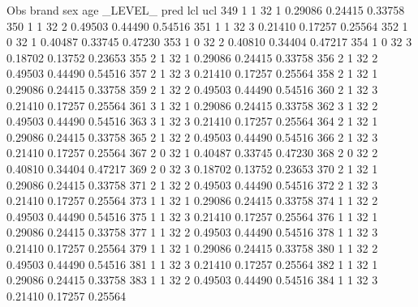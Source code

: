 \documentclass{article}
\begin{document}
\begin{Woutput}
 Obs    brand    sex    age    _LEVEL_      pred       lcl        ucl
 349      1       1      32       1       0.29086    0.24415    0.33758
 350      1       1      32       2       0.49503    0.44490    0.54516
 351      1       1      32       3       0.21410    0.17257    0.25564
 352      1       0      32       1       0.40487    0.33745    0.47230
 353      1       0      32       2       0.40810    0.34404    0.47217
 354      1       0      32       3       0.18702    0.13752    0.23653
 355      2       1      32       1       0.29086    0.24415    0.33758
 356      2       1      32       2       0.49503    0.44490    0.54516
 357      2       1      32       3       0.21410    0.17257    0.25564
 358      2       1      32       1       0.29086    0.24415    0.33758
 359      2       1      32       2       0.49503    0.44490    0.54516
 360      2       1      32       3       0.21410    0.17257    0.25564
 361      3       1      32       1       0.29086    0.24415    0.33758
 362      3       1      32       2       0.49503    0.44490    0.54516
 363      3       1      32       3       0.21410    0.17257    0.25564
 364      2       1      32       1       0.29086    0.24415    0.33758
 365      2       1      32       2       0.49503    0.44490    0.54516
 366      2       1      32       3       0.21410    0.17257    0.25564
 367      2       0      32       1       0.40487    0.33745    0.47230
 368      2       0      32       2       0.40810    0.34404    0.47217
 369      2       0      32       3       0.18702    0.13752    0.23653
 370      2       1      32       1       0.29086    0.24415    0.33758
 371      2       1      32       2       0.49503    0.44490    0.54516
 372      2       1      32       3       0.21410    0.17257    0.25564
 373      1       1      32       1       0.29086    0.24415    0.33758
 374      1       1      32       2       0.49503    0.44490    0.54516
 375      1       1      32       3       0.21410    0.17257    0.25564
 376      1       1      32       1       0.29086    0.24415    0.33758
 377      1       1      32       2       0.49503    0.44490    0.54516
 378      1       1      32       3       0.21410    0.17257    0.25564
 379      1       1      32       1       0.29086    0.24415    0.33758
 380      1       1      32       2       0.49503    0.44490    0.54516
 381      1       1      32       3       0.21410    0.17257    0.25564
 382      1       1      32       1       0.29086    0.24415    0.33758
 383      1       1      32       2       0.49503    0.44490    0.54516
 384      1       1      32       3       0.21410    0.17257    0.25564

\end{Woutput}
\end{document}
